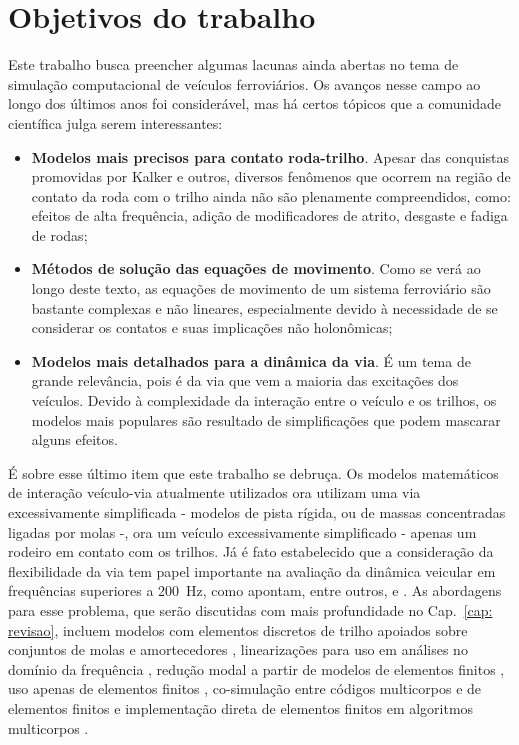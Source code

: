 \section{Objetivos do trabalho}
Este trabalho busca preencher algumas lacunas ainda abertas no tema de simulação computacional de veículos ferroviários. Os avanços nesse campo ao longo dos últimos anos foi considerável, mas há certos tópicos que a comunidade científica \cite{evans_challenges_2009} julga serem interessantes:
\begin{itemize}
 \item \textbf{Modelos mais precisos para contato roda-trilho}. Apesar das conquistas promovidas por Kalker e outros, diversos fenômenos que ocorrem na região de contato da roda com o trilho ainda não são plenamente compreendidos, como: efeitos de alta frequência, adição de modificadores de atrito, desgaste e fadiga de rodas;
 \item \textbf{Métodos de solução das equações de movimento}. Como se verá ao longo deste texto, as equações de movimento de um sistema ferroviário são bastante complexas e não lineares, especialmente devido à necessidade de se considerar os contatos e suas implicações não holonômicas;
 \item \textbf{Modelos mais detalhados para a dinâmica da via}. É um tema de grande relevância, pois é da via que vem a maioria das excitações dos veículos. Devido à complexidade da interação entre o veículo e os trilhos, os modelos mais populares são resultado de simplificações que podem mascarar alguns efeitos.
\end{itemize}

É sobre esse último item que este trabalho se debruça. Os modelos matemáticos de interação veículo-via atualmente utilizados ora utilizam uma via excessivamente simplificada - modelos de pista rígida, ou de massas concentradas ligadas por molas -, ora um veículo excessivamente simplificado - apenas um rodeiro em contato com os trilhos. Já é fato estabelecido que a consideração da flexibilidade da via tem papel importante na avaliação da dinâmica veicular em frequências superiores a \SI{200}{\hertz}, como apontam, entre outros,  e . As abordagens para esse problema, que serão discutidas com mais profundidade no 
Cap.~\ref{cap: revisao}, incluem modelos com elementos discretos de trilho apoiados sobre conjuntos de molas e amortecedores \cite[p.26]{knothe_rail_2017}, linearizações para uso 
em análises no domínio da frequência \cite{ding_effects_2016}, redução modal a partir de modelos de elementos finitos \cite{baeza_railway_2011}, uso apenas de elementos finitos \cite{guimaraes_alise_1999,lundqvist_load_2005}, co-simulação entre códigos multicorpos e de elementos finitos \cite{pombo_flexible_2013,pombo_development_2019} e implementação direta de elementos finitos em algoritmos multicorpos \cite{shabana_absolute_1997,shabana_alternative_2009}.

